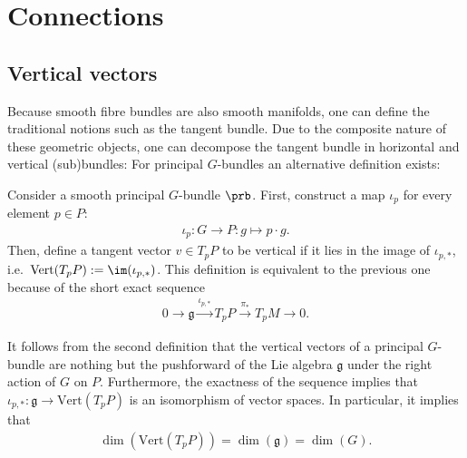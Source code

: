 \section{Connections}\label{section:connections}
\subsection{Vertical vectors}

    Because smooth fibre bundles are also smooth manifolds, one can define the traditional notions such as the tangent bundle. Due to the composite nature of these geometric objects, one can decompose the tangent bundle in horizontal and vertical (sub)bundles:
    For principal $G$-bundles an alternative definition exists:
    \begin{adefinition}
        Consider a smooth principal $G$-bundle $\prb$. First, construct a map $\iota_p$ for every element $p\in P$:
        \begin{gather}
            \iota_p:G\rightarrow P:g\mapsto p\cdot g.
        \end{gather}
        Then, define a tangent vector $v\in T_p P$ to be vertical if it lies in the image of $\iota_{p,\ast}$, i.e.~$\mathrm{Vert}(T_pP) := \im(\iota_{p,\ast})$. This definition is equivalent to the previous one because of the short exact sequence
        \begin{gather}
            \label{bundle:principal_bundle_exact_sequence}
            0\longrightarrow\mathfrak{g}\overset{\iota_{p,\ast}}{\longrightarrow}T_pP\overset{\pi_\ast}{\longrightarrow}T_pM\longrightarrow0.
        \end{gather}
    \end{adefinition}

    \begin{property}\label{bundle:vertical_dimension}
        It follows from the second definition that the vertical vectors of a principal $G$-bundle are nothing but the pushforward of the Lie algebra $\mathfrak{g}$ under the right action of $G$ on $P$. Furthermore, the exactness of the sequence implies that $\iota_{p,\ast}:\mathfrak{g}\rightarrow\mathrm{Vert}(T_pP)$ is an isomorphism of vector spaces. In particular, it implies that
        \begin{gather}
            \dim(\mathrm{Vert}(T_pP)) = \dim(\mathfrak{g}) = \dim(G).
        \end{gather}
    \end{property}

